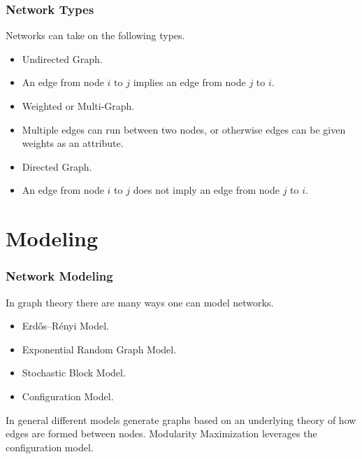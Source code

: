 \documentclass{beamer}
\begin{document}
\begin{frame}

    \frametitle{Network Types}

    Networks can take on the following types.\pause

    \vspace{2.5mm}
    \begin{itemize}
        \item Undirected Graph.\pause
        \item[$\diamond$] An edge from node $ i $ to $ j $ implies an edge from node $ j $ to $ i $.\pause
        \item Weighted or Multi-Graph.\pause
        \item[$\diamond$] Multiple edges can run between two nodes, or otherwise edges can be given weights as an attribute.\pause
        \item Directed Graph.\pause
        \item[$\diamond$] An edge from node $ i $ to $ j $ does not imply an edge from node $ j $ to $ i $.
    \end{itemize}

\end{frame}


\section{Modeling}

\begin{frame}

    \frametitle{Network Modeling}

    In graph theory there are many ways one can model networks.\pause

    \vspace{2.5mm}
    \begin{itemize}
        \item Erdős–Rényi Model.\pause
        \item Exponential Random Graph Model.\pause
        \item Stochastic Block Model.\pause
        \item Configuration Model.\pause
    \end{itemize}
    \vspace{2.5mm}

    In general different models generate graphs based on an underlying theory of how edges are formed between nodes.
    Modularity Maximization leverages the configuration model.

\end{frame}
\end{document}
